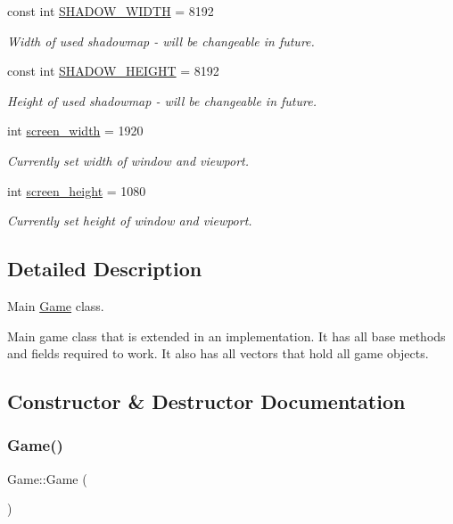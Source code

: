 \begin{DoxyCompactItemize}
const int \mbox{\hyperlink{class_game_abf4d8e38c95fc6e1351e6dd85a19429f}{S\+H\+A\+D\+O\+W\+\_\+\+W\+I\+D\+TH}} = 8192
\begin{DoxyCompactList}\small\item\em Width of used shadowmap -\/ will be changeable in future. \end{DoxyCompactList}\item 
const int \mbox{\hyperlink{class_game_a6ff4bf491706f3c85c1de2ed7983a51b}{S\+H\+A\+D\+O\+W\+\_\+\+H\+E\+I\+G\+HT}} = 8192
\begin{DoxyCompactList}\small\item\em Height of used shadowmap -\/ will be changeable in future. \end{DoxyCompactList}\item 
int \mbox{\hyperlink{class_game_ac05df6adfb712932bac2afea1fb01dc3}{screen\+\_\+width}} = 1920
\begin{DoxyCompactList}\small\item\em Currently set width of window and viewport. \end{DoxyCompactList}\item 
int \mbox{\hyperlink{class_game_ab52e2343e6335e426a6395c44f4dab71}{screen\+\_\+height}} = 1080
\begin{DoxyCompactList}\small\item\em Currently set height of window and viewport. \end{DoxyCompactList}\end{DoxyCompactItemize}


\subsection{Detailed Description}
Main \mbox{\hyperlink{class_game}{Game}} class. 

Main game class that is extended in an implementation. It has all base methods and fields required to work. It also has all vectors that hold all game objects. 

\subsection{Constructor \& Destructor Documentation}
\mbox{\label{class_game_ad59df6562a58a614fda24622d3715b65}} 
\subsubsection{\texorpdfstring{Game()}{Game()}}
{\footnotesize\ttfamily Game\+::\+Game (\begin{DoxyParamCaption}{ }\end{DoxyParamCaption})}



